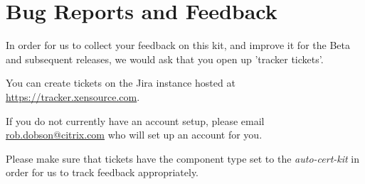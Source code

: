 \documentclass[a4paper,11pt]{article}
\begin{document}
\section{Bug Reports and Feedback}
In order for us to collect your feedback on this kit, and improve it for the Beta and subsequent releases, we would ask that you open up 'tracker tickets'.

You can create tickets on the Jira instance hosted at \url{https://tracker.xensource.com}.

If you do not currently have an account setup, please email \href{mailto:rob.dobson@citrix.com}{rob.dobson@citrix.com} who will set up an account for you.

Please make sure that tickets have the component type set to the \emph{auto-cert-kit} in order for us to track feedback appropriately.
\end{document}
